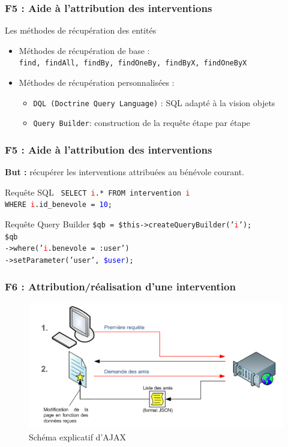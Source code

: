 \begin{frame}
\frametitle{F5 : Aide à l'attribution des interventions}
	\begin{block}{Les méthodes de récupération des entités}
		\begin{itemize}
			\item Méthodes de récupération de base : \\
			 \texttt{find, findAll, findBy, findOneBy, findByX, findOneByX}
			\item Méthodes de récupération personnalisées : \\
			\begin{itemize}
			\item \texttt{DQL (Doctrine Query Language)} : SQL adapté à la vision objets
			\item \texttt{Query Builder}: construction de la requête étape par étape
			\end{itemize}			
		\end{itemize}
	  \end{block}
\end{frame}

\begin{frame}
\frametitle{F5 : Aide à l'attribution des interventions}
	\textbf{But :} récupérer les interventions attribuées au bénévole courant. \\
	\vskip 0.5cm
	\begin{block}{Requête SQL }	
	\texttt{ 
	SELECT \textcolor{red}{i}.* FROM intervention \textcolor{red}{i} \\
	\setlength{\parindent}{1cm}	WHERE \textcolor{red}{i}.id\_benevole = \textcolor{blue}{10};}
	\end{block}
	\begin{block}{Requête Query Builder }
	\noindent \texttt{\$qb = \$this->createQueryBuilder('\textcolor{red}{i}'); \\
	\noindent \$qb \\
	\setlength{\parindent}{1cm} ->where('\textcolor{red}{i}.benevole = :user') \\
    \setlength{\parindent}{1cm} ->setParameter('user', \textcolor{blue}{\$user});}
	\end{block}
\end{frame}

\begin{frame}
\frametitle{F6 : Attribution/réalisation d'une intervention}
      \begin{figure}[r]
		\includegraphics[scale=0.35]{images/ajax.png}
		\caption{Schéma explicatif d'AJAX}
	  \end{figure}
\end{frame}
